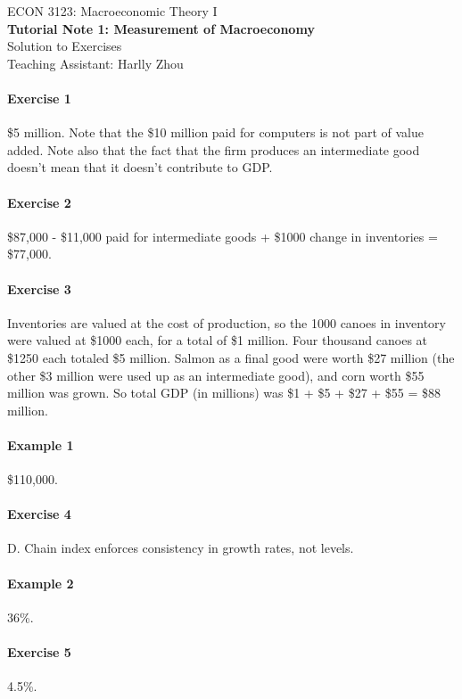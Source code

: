 \documentclass[12pt]{article}
\numberwithin{equation}{section}
\begin{document}
\begin{center}
    ECON 3123: Macroeconomic Theory I\\
    {\large \textbf{Tutorial Note 1: Measurement of Macroeconomy}}\\
    Solution to Exercises\\
    Teaching Assistant: Harlly Zhou
\end{center}

\paragraph{Exercise 1}
\$5 million. Note that the \$10 million paid for computers is not part of value added. Note also that the fact that the firm produces an intermediate good doesn't mean that it doesn't contribute to GDP.

\paragraph{Exercise 2}
\$87,000 - \$11,000 paid for intermediate goods + \$1000 change in inventories = \$77,000.

\paragraph{Exercise 3}
Inventories are valued at the cost of production, so the 1000 canoes in inventory were valued at \$1000 each, for a total of \$1 million. Four thousand canoes at \$1250 each totaled \$5 million. Salmon as a final good were worth \$27 million (the other \$3 million were used up as an intermediate good), and corn worth \$55 million was grown. So total GDP (in millions) was \$1 + \$5 + \$27 + \$55 = \$88 million. 

\paragraph{Example 1}
\$110,000.

\paragraph{Exercise 4}
D. Chain index enforces consistency in growth rates, not levels.

\paragraph{Example 2}
36\%.

\paragraph{Exercise 5}
4.5\%.
\end{document}
